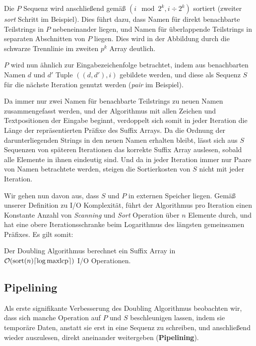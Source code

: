 Die $P$ Sequenz wird anschließend gemäß $(i \mod 2^k, i \div 2^k)$ sortiert (zweiter \textit{sort} Schritt im Beispiel). Dies führt dazu, dass Namen für direkt benachbarte Teilstrings in $P$ nebeneinander liegen, und Namen für überlappende Teilstrings in separaten Abschnitten von $P$ liegen. Dies wird in der Abbildung durch die schwarze Trennlinie im zweiten $p^k$ Array deutlich.

$P$ wird nun ähnlich zur Eingabezeichenfolge betrachtet, indem aus benachbarten Namen $d$ und $d'$ Tuple $((d, d'), i)$ gebildete werden, und diese als Sequenz $S$ für die nächste Iteration genutzt werden (\textit{pair} im Beispiel).

Da immer nur zwei Namen für benachbarte Teilstrings zu neuen Namen zusammengefasst werden, und der Algorithmus mit allen Zeichen und Textpositionen der Eingabe beginnt, verdoppelt sich somit in jeder Iteration die Länge der repräsentierten Präfixe des Suffix Arrays. Da die Ordnung der darunterliegenden Strings in den neuen Namen erhalten bleibt, lässt sich aus $S$ Sequenzen von späteren Iterationen das korrekte Suffix Array auslesen, sobald alle Elemente in ihnen eindeutig sind. Und da in jeder Iteration immer nur Paare von Namen betrachtete werden, steigen die Sortierkosten von $S$ nicht mit jeder Iteration.

Wir gehen nun davon aus, dass $S$ und $P$ in externen Speicher liegen.  Gemäß unserer Definition zu I/O Komplexität, führt der Algorithmus pro Iteration einen Konstante Anzahl von \textit{Scanning} und \textit{Sort} Operation über $n$ Elemente durch, und hat eine obere Iterationsschranke beim Logarithmus des längsten gemeinsamen Präfixes. Es gilt somit:

\begin{theorem}
Der Doubling Algorithmus berechnet ein Suffix Array in\\ $\mathcal{O}(\text{sort}(n) \ceil*{\log \text{maxlcp}})$ I/O Operationen.
\end{theorem}

\subsection{Pipelining}
\label{algo:doubling:sec:pipelining}

Als erste signifikante Verbesserung des Doubling Algorithmus beobachten wir, dass sich manche Operation auf $P$ und $S$ beschleunigen lassen, indem sie temporäre Daten, anstatt sie erst in eine Sequenz zu schreiben, und anschließend wieder auszulesen, direkt aneinander weitergeben (\textbf{Pipelining}). 


